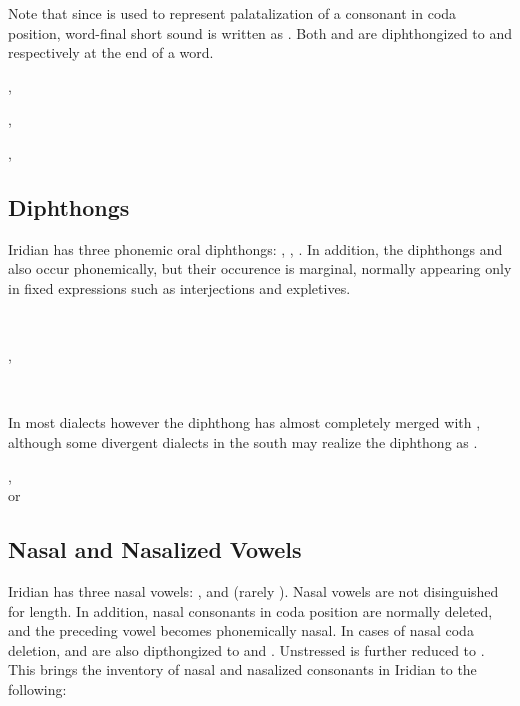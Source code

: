 Note that since  is used to represent palatalization of a consonant in coda position, word-final short  sound is written as . Both  and  are diphthongized to  and  respectively at the end of a word.

\ex
{}, \\
\xe

\ex
{}, \\
\xe

\ex
{}, \\
\xe

\subsection{Diphthongs}
Iridian has three phonemic oral diphthongs:  ,  \nt{\dte},  \nt{\dto}. In addition, the diphthongs   and   also occur phonemically, but their occurence is marginal, normally appearing only in fixed expressions such as interjections and expletives.

\ex
{} \\
\xe

\ex
{}, \\
\xe

\ex
{} \\
\xe

In most dialects however the diphthong \nt{\dte} has almost completely merged with  , although some divergent dialects in the south may realize the diphthong as .


\ex
{}, \\
 or  
\xe

\subsection{Nasal and Nasalized Vowels}
Iridian has three nasal vowels:  ,   and   (rarely ). Nasal vowels are not disinguished for length. In addition, nasal consonants in coda position are normally deleted, and the preceding vowel becomes phonemically nasal. In cases of nasal coda deletion,   and   are also dipthongized to  and . Unstressed  is further reduced to . This brings the inventory of nasal and nasalized consonants in Iridian to the following: 

